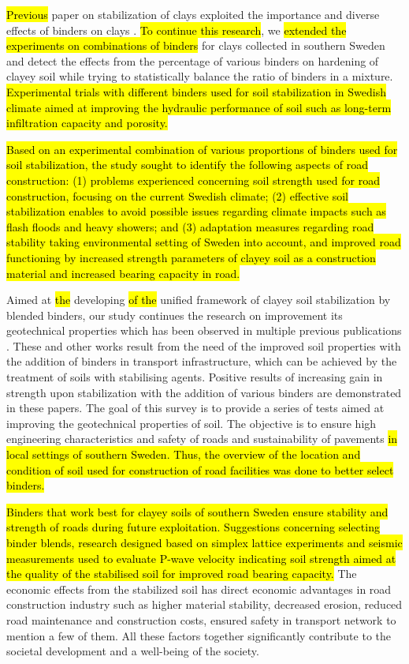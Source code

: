 \documentclass[constrmater,article,submit,pdftex,moreauthors]{Definitions/mdpi}
\begin{document}
\hl{Previous} paper on stabilization of clays\hl{ }exploited the importance and diverse effects of binders on clays \cite{Okagbue,Estabragh,Xu}. \hl{To continue this research}, we \hl{extended the experiments on combinations of binders} for clays collected in southern Sweden and detect the effects from the percentage of various binders on hardening of clayey soil while trying to statistically balance the ratio of binders in a mixture. \hl{Experimental trials with different binders used for soil stabilization in Swedish climate aimed at improving the hydraulic performance of soil such as long-term infiltration capacity and porosity.}

\hl{Based on an experimental combination of various proportions of binders used for soil stabilization, the study sought to identify the following aspects of road construction: (1) problems experienced concerning soil strength used for road construction, focusing on the current Swedish climate; (2) effective soil stabilization enables to avoid possible issues regarding climate impacts such as flash floods and heavy showers; and (3) adaptation measures regarding road stability taking environmental setting of Sweden into account, and improved road functioning by increased strength parameters of clayey soil as a construction material and increased bearing capacity in road.}

Aimed at \hl{the }developing \hl{of the} unified\hl{ }framework of clayey soil stabilization by blended binders, our study continues the research on improvement its geotechnical properties which has been observed in multiple previous publications \citep{Sorengard,AlSwaidani,Feng,LindhLemenkovaECES,Maheepala,Lindh2022NL,Nordmark}. These and other works result from the need of the improved soil properties with the addition of binders in transport infrastructure, which can be achieved by the treatment of soils with stabilising agents. Positive results of increasing gain in strength upon stabilization with the addition of various binders are demonstrated in these papers. The goal of this survey is to provide a series of tests aimed at improving the geotechnical properties of soil. The objective is to ensure high engineering characteristics and safety of roads and sustainability of pavements\hl{ in local settings of southern Sweden. Thus, the overview of the location and condition of soil used for construction of road facilities was done to better select binders.} 

\hl{Binders that work best for clayey soils of southern Sweden ensure stability and strength of roads during future exploitation. Suggestions concerning selecting binder blends, research designed based on simplex lattice experiments and seismic measurements used to evaluate P-wave velocity indicating soil strength aimed at the quality of the stabilised soil for improved road bearing capacity. }The economic effects from the stabilized soil has direct economic advantages in road construction industry such as higher material stability, decreased erosion, reduced road maintenance and construction costs, ensured safety in transport network to mention a few of them. All these factors together significantly contribute to the societal development and a well-being of the society.
\end{document}
